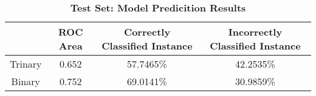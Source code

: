 \documentclass[10pt]{article}
\begin{document}
\begin{table}[!ht]
\caption{
\bf{Test Set: Model Predicition Results}}
\begin{tabular}{|c|c|c|c|}
\hline\hline %
& ROC Area & Correctly Classified Instance & Incorrectly Classified Instance \\
\hline
\hline
Trinary & 0.652 & 57.7465\% & 42.2535\% \\
\hline
Binary & 0.752 & 69.0141\% & 30.9859\% \\
\hline
\end{tabular}
\begin{flushleft}
\end{flushleft}
\label{table:test_results} 
\end{table}
\end{document}
